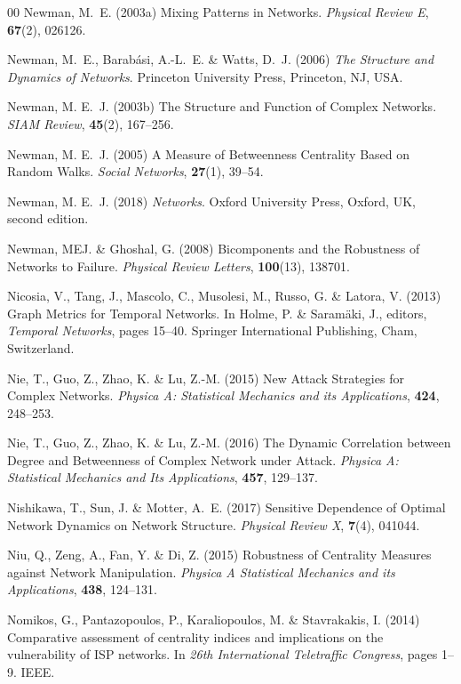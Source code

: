 \documentclass{comnet-mod}
\begin{document}
\begin{thebibliography}{00}
Newman, M.~E. (2003a)  {Mixing Patterns in Networks}. {\em {Physical Review
  E}}, \textbf{67}(2), 026126.

Newman, M.~E., Barab{\'a}si, A.-L.~E. {\&} Watts, D.~J. (2006) {\em {The
  Structure and Dynamics of Networks}}.
{Princeton University Press}, {Princeton, NJ, USA}.

Newman, M. E.~J. (2003b)  {The Structure and Function of Complex Networks}.
  {\em {SIAM Review}}, \textbf{45}(2), 167--256.

Newman, M. E.~J. (2005)  {A Measure of Betweenness Centrality Based on Random
  Walks}. {\em {Social Networks}}, \textbf{27}(1), 39--54.

Newman, M. E.~J. (2018) {\em {Networks}}.
{Oxford University Press}, {Oxford, UK}, second edition.

Newman, {\relax MEJ}. {\&} Ghoshal, G. (2008)  {Bicomponents and the Robustness
  of Networks to Failure}. {\em {Physical Review Letters}}, \textbf{100}(13),
  138701.

Nicosia, V., Tang, J., Mascolo, C., Musolesi, M., Russo, G. {\&} Latora, V.
  (2013)  {Graph Metrics for Temporal Networks}. In Holme, P. {\&} Saram\"aki,
  J., editors, {\em {Temporal Networks}}, pages 15--40. {Springer International
  Publishing}, Cham, Switzerland.

Nie, T., Guo, Z., Zhao, K. {\&} Lu, Z.-M. (2015)  {New Attack Strategies for
  Complex Networks}. {\em {Physica A: Statistical Mechanics and its
  Applications}}, \textbf{424}, 248--253.

Nie, T., Guo, Z., Zhao, K. {\&} Lu, Z.-M. (2016)  {The Dynamic Correlation
  between Degree and Betweenness of Complex Network under Attack}. {\em
  {Physica A: Statistical Mechanics and Its Applications}}, \textbf{457},
  129--137.

Nishikawa, T., Sun, J. {\&} Motter, A.~E. (2017)  {Sensitive Dependence of
  Optimal Network Dynamics on Network Structure}. {\em {Physical Review X}},
  \textbf{7}(4), 041044.

Niu, Q., Zeng, A., Fan, Y. {\&} Di, Z. (2015)  {Robustness of Centrality
  Measures against Network Manipulation}. {\em {Physica A Statistical Mechanics
  and its Applications}}, \textbf{438}, 124--131.

Nomikos, G., Pantazopoulos, P., Karaliopoulos, M. {\&} Stavrakakis, I. (2014)
  {Comparative assessment of centrality indices and implications on the
  vulnerability of ISP networks}. In {\em {26th International Teletraffic
  Congress}}, pages 1--9. IEEE.


\end{thebibliography}
\end{document}
